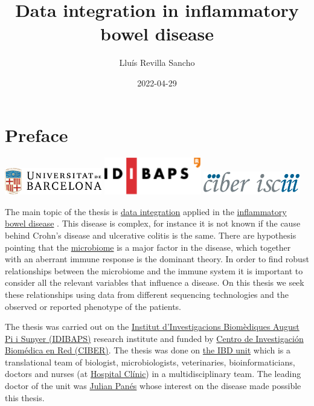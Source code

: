 \documentclass[
  12pt,
  a4paper,
  twoside,
  openright]{book}
\title{Data integration in inflammatory bowel disease}
\author{Lluís Revilla Sancho}
\date{2022-04-29}
\begin{document}
\maketitle

{
\hypersetup{linkcolor=}
\setcounter{tocdepth}{2}
\tableofcontents
}
\listoffigures
\listoftables
\hypertarget{preface}{%
\chapter*{Preface}\label{preface}}

\includegraphics[width=1.66667in,height=\textheight]{images/ub_logo.png} \includegraphics[width=1.66667in,height=\textheight]{images/idibaps_logo.png} \includegraphics[width=1.66667in,height=0.39583in]{images/logo_ciber.png}

The main topic of the thesis is \href{https://en.wikipedia.org/wiki/Data_integration}{data integration} applied in the \href{https://en.wikipedia.org/wiki/Inflammatory_bowel_disease}{inflammatory bowel disease} .
This disease is complex, for instance it is not known if the cause behind Crohn's disease and ulcerative colitis is the same.
There are hypothesis pointing that the \href{https://en.wikipedia.org/wiki/Microbiota}{microbiome} is a major factor in the disease, which together with an aberrant immune response is the dominant theory.
In order to find robust relationships between the microbiome and the immune system it is important to consider all the relevant variables that influence a disease.
On this thesis we seek these relationships using data from different sequencing technologies and the observed or reported phenotype of the patients.

The thesis was carried out on the \href{https://www.idibaps.org/}{Institut d'Investigacions Biomèdiques August Pi i Sunyer (IDIBAPS)} research institute and funded by \href{https://www.ciberehd.org/}{Centro de Investigación Biomédica en Red (CIBER)}.
The thesis was done on \href{https://www.ibd-bcn.org/}{the IBD unit} which is a translational team of biologist, microbiologists, veterinaries, bioinformaticians, doctors and nurses (at \href{https://www.clinicbarcelona.org/en}{Hospital Clínic}) in a multidisciplinary team.
The leading doctor of the unit was \href{https://orcid.org/0000-0002-4971-6902}{Julian Panés} whose interest on the disease made possible this thesis.
\end{document}
